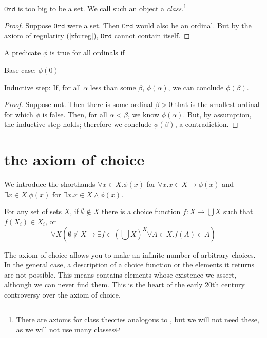 \documentclass{scrbook}
\renewcommand{\implies}{\to}
\newcommand{\ord}{\mathtt{Ord}}
\begin{document}
\begin{theorem}[$\ord$ is too big to be a set]\label{th:ord-proper-class}
  $\ord$ is too big to be a set. We call such an object a \emph{class}.\footnote{There are axioms for class theories analogous to \zfc, but we will not need these, as we will not use many classes}
\end{theorem}
\begin{proof}
  Suppose $\ord$ were a set. Then $\ord$ would also be an ordinal. But by the axiom of regularity (\ref{zfc:reg}), $\ord$ cannot contain itself. 
\end{proof}
\begin{theorem}\label{def:trans-ind}
  A predicate $\phi$ is true for all ordinals if
  \begin{trivlist}
  \item Base case: $\phi(0)$
  \item Inductive step: If, for all $\alpha$ less than some $\beta$, $\phi(\alpha)$, we can conclude $\phi(\beta)$. 
  \end{trivlist}
\end{theorem}
\begin{proof}
  Suppose not. Then there is some ordinal $\beta>0$ that is the smallest ordinal for which $\phi$ is false. Then, for all $\alpha < \beta$, we know $\phi(\alpha)$. But, by assumption, the inductive step holds; therefore we conclude $\phi(\beta)$, a contradiction. 
\end{proof}
\section[The axiom of choice]{the axiom of choice}
We introduce the shorthands $\forall x \in X . \phi(x)$ for $\forall x . x\in X \implies \phi(x)$ and $\exists x \in X.\phi(x)$ for $\exists x . x\in X \wedge \phi(x)$. 
\begin{defn} \label{choice}
  For any set of sets $X$, if $\emptyset \notin X$ there is a choice function $f:X\to \bigcup X$ such that $f(X_i)\in X_i$, or 
\begin{equation}
\forall X \left(\emptyset \notin X \implies \exists f \in \left(\bigcup X\right)^X \forall A \in X . f(A)\in A\right)
\label{eq:choice}
\end{equation}
\end{defn}
The axiom of choice allows you to make an infinite number of arbitrary choices. In the general case, a description of a choice function or the elements it returns are not possible. This means \zfc contains elements whose existence we assert, although we can never find them. This is the heart of the early 20th century controversy over the axiom of choice. 
\end{document}

